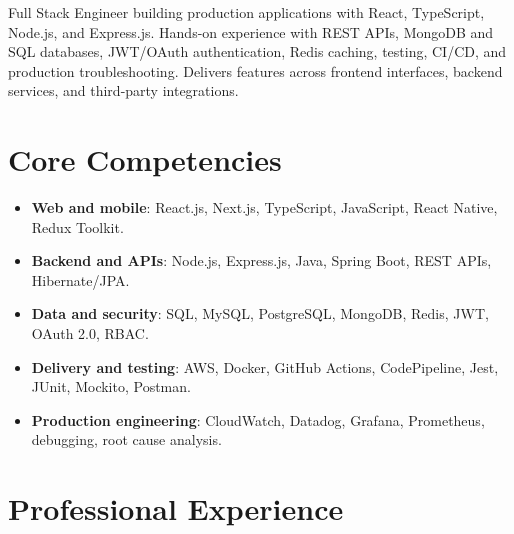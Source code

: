 \documentclass[11pt,a4paper,sans]{moderncv}
\begin{document}
\makecvtitle


\vspace{6pt}
{\small Full Stack Engineer building production applications with React, TypeScript, Node.js, and Express.js. Hands-on experience with REST APIs, MongoDB and SQL databases, JWT/OAuth authentication, Redis caching, testing, CI/CD, and production troubleshooting. Delivers features across frontend interfaces, backend services, and third-party integrations.\par}


\section{Core Competencies}
\vspace{1pt}
\begin{itemize}

\item \textbf{Web and mobile}: React.js, Next.js, TypeScript, JavaScript, React Native, Redux Toolkit.

\item \textbf{Backend and APIs}: Node.js, Express.js, Java, Spring Boot, REST APIs, Hibernate/JPA.

\item \textbf{Data and security}: SQL, MySQL, PostgreSQL, MongoDB, Redis, JWT, OAuth 2.0, RBAC.

\item \textbf{Delivery and testing}: AWS, Docker, GitHub Actions, CodePipeline, Jest, JUnit, Mockito, Postman.

\item \textbf{Production engineering}: CloudWatch, Datadog, Grafana, Prometheus, debugging, root cause analysis.

\end{itemize}


\section{Professional Experience}
\vspace{3pt}
\end{document}
